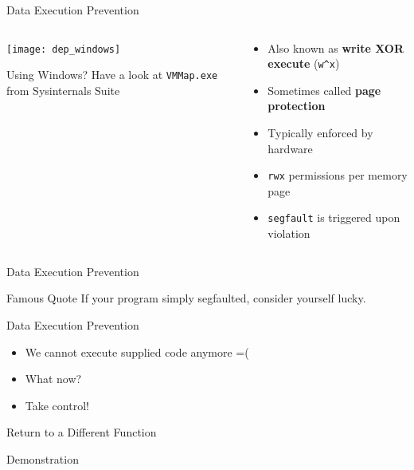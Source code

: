 \documentclass[beamer]{uibk}
\begin{document}
\begin{frame}{Data Execution Prevention}
    \begin{columns}
        \begin{column}{0.5\textwidth}
            \begin{center}
                \texttt{[image: dep\_windows]}
            \end{center}
            \medskip

            Using Windows? Have a look at \texttt{VMMap.exe} from Sysinternals Suite
        \end{column}
        \begin{column}{0.5\textwidth}
            \begin{itemize}
                \item Also known as \textbf{write XOR execute} (\texttt{w\^{}x})
                \medskip
                \item Sometimes called \textbf{page protection}
                \bigskip
                \item Typically enforced by hardware
                \medskip
                \item \texttt{rwx} permissions per memory page
                \medskip
                \item \texttt{segfault} is triggered upon violation
            \end{itemize}
        \end{column}
    \end{columns}
\end{frame}

\begin{frame}{Data Execution Prevention}
    \begin{block}{Famous Quote}
        If your program simply segfaulted, consider yourself lucky.
    \end{block}
\end{frame}

\begin{frame}{Data Execution Prevention}
    \begin{itemize}
        \item We cannot execute supplied code anymore =(
        \item What now?
        \bigskip
        \pause
        \item Take control!
    \end{itemize}
\end{frame}

\begin{frame}{Return to a Different Function}
    \begin{center}
        \huge Demonstration
    \end{center}
\end{frame}
\end{document}
